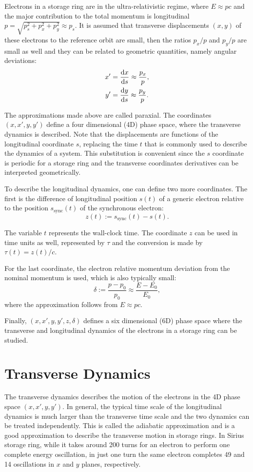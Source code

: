 Electrons in a storage ring are in the ultra-relativistic regime, where $E \approx pc$ and the major contribution to the total momentum is longitudinal $p = \sqrt{p_s^2 + p_x^2 + p_y^2} \approx p_s$. It is assumed that transverse displacements $(x, y)$ of these electrons to the reference orbit are small, then the ratios $p_x/p$ and $p_y/p$ are small as well and they can be related to geometric quantities, namely angular deviations:
\begin{align*}
    x' &= \frac{\mathrm{d} x}{\mathrm{d} s} \approx \frac{p_x}{p}, \\
    y' &= \frac{\mathrm{d} y}{\mathrm{d} s} \approx \frac{p_y}{p}.
\end{align*}

The approximations made above are called paraxial. The coordinates $(x, x', y, y')$ define a four dimensional (4D) phase space, where the transverse dynamics is described. Note that the displacements are functions of the longitudinal coordinate $s$, replacing the time $t$ that is commonly used to describe the dynamics of a system. This substitution is convenient since the $s$ coordinate is periodic for a storage ring and the transverse coordinates derivatives can be interpreted geometrically.

To describe the longitudinal dynamics, one can define two more coordinates. The first is the difference of longitudinal position $s(t)$ of a generic electron relative to the position $s_{\mathrm{sync}}(t)$ of the synchronous electron:
\begin{equation}
    z(t) := s_{\mathrm{sync}}(t) - s(t).
\end{equation}

The variable $t$ represents the wall-clock time. The coordinate $z$ can be used in time units as well, represented by $\tau$ and the conversion is made by $\tau(t) = z(t)/c$. 

For the last coordinate, the electron relative momentum deviation from the nominal momentum is used, which is also typically small:
\begin{equation}
    \delta := \frac{p - p_0}{p_0} \approx \frac{E - E_0}{E_0},
\end{equation}
where the approximation follows from $E \approx pc$.

Finally, $(x, x', y, y', z, \delta)$ defines a six dimensional (6D) phase space where the transverse and longitudinal dynamics of the electrons in a storage ring can be studied.
\section{Transverse Dynamics}\label{tranverse}
The transverse dynamics describes the motion of the electrons in the 4D phase space $(x, x', y, y')$. In general, the typical time scale of the longitudinal dynamics is much larger than the transverse time scale and the two dynamics can be treated independently. This is called the adiabatic approximation and is a good approximation to describe the transverse motion in storage rings. In Sirius storage ring, while it takes around 200 turns for an electron to perform one complete energy oscillation, in just one turn the same electron completes 49 and 14 oscillations in $x$ and $y$ planes, respectively.

